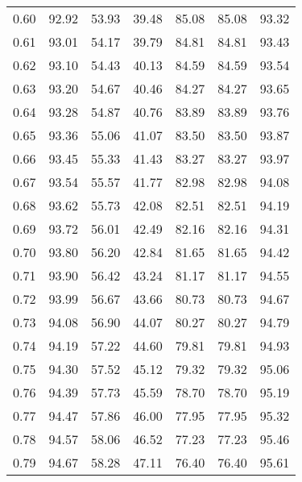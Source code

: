 \begin{tabular}{|c|c|c|c|c|c|c|}
      0.60 &     92.92 &     53.93 &      39.48 &   85.08 &      85.08 &         93.32 \\
      0.61 &     93.01 &     54.17 &      39.79 &   84.81 &      84.81 &         93.43 \\
      0.62 &     93.10 &     54.43 &      40.13 &   84.59 &      84.59 &         93.54 \\
      0.63 &     93.20 &     54.67 &      40.46 &   84.27 &      84.27 &         93.65 \\
      0.64 &     93.28 &     54.87 &      40.76 &   83.89 &      83.89 &         93.76 \\
      0.65 &     93.36 &     55.06 &      41.07 &   83.50 &      83.50 &         93.87 \\
      0.66 &     93.45 &     55.33 &      41.43 &   83.27 &      83.27 &         93.97 \\
      0.67 &     93.54 &     55.57 &      41.77 &   82.98 &      82.98 &         94.08 \\
      0.68 &     93.62 &     55.73 &      42.08 &   82.51 &      82.51 &         94.19 \\
      0.69 &     93.72 &     56.01 &      42.49 &   82.16 &      82.16 &         94.31 \\
      0.70 &     93.80 &     56.20 &      42.84 &   81.65 &      81.65 &         94.42 \\
      0.71 &     93.90 &     56.42 &      43.24 &   81.17 &      81.17 &         94.55 \\
      0.72 &     93.99 &     56.67 &      43.66 &   80.73 &      80.73 &         94.67 \\
      0.73 &     94.08 &     56.90 &      44.07 &   80.27 &      80.27 &         94.79 \\
      0.74 &     94.19 &     57.22 &      44.60 &   79.81 &      79.81 &         94.93 \\
      0.75 &     94.30 &     57.52 &      45.12 &   79.32 &      79.32 &         95.06 \\
      0.76 &     94.39 &     57.73 &      45.59 &   78.70 &      78.70 &         95.19 \\
      0.77 &     94.47 &     57.86 &      46.00 &   77.95 &      77.95 &         95.32 \\
      0.78 &     94.57 &     58.06 &      46.52 &   77.23 &      77.23 &         95.46 \\
      0.79 &     94.67 &     58.28 &      47.11 &   76.40 &      76.40 &         95.61 \\

\end{tabular}
